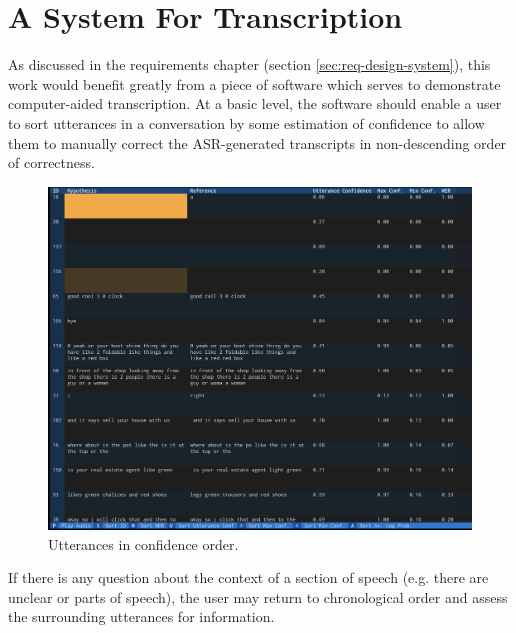 \section{A System For Transcription}

As discussed in the requirements chapter (section \ref{sec:req-design-system}), this work would benefit greatly from a piece of software which serves to demonstrate computer-aided transcription.
At a basic level, the software should enable a user to sort utterances in a conversation by some estimation of confidence to allow them to manually correct the ASR-generated transcripts in non-descending order of correctness.

\begin{figure}[h]
  \centering
  \includegraphics[width=\textwidth]{images/confidence-order.png}
  \caption{Utterances in confidence order.}
  \label{fig:sys-confidence}
\end{figure}

If there is any question about the context of a section of speech (e.g. there are unclear or  parts of speech), the user may return to chronological order and assess the surrounding utterances for information.

